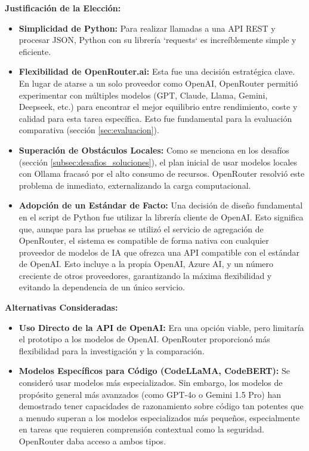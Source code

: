 \textbf{Justificación de la Elección:}
\begin{itemize}
    \item \textbf{Simplicidad de Python:} Para realizar llamadas a una API REST y procesar JSON, Python con su librería `requests` es increíblemente simple y eficiente.
    \item \textbf{Flexibilidad de OpenRouter.ai:} Esta fue una decisión estratégica clave. En lugar de atarse a un solo proveedor como OpenAI, OpenRouter permitió experimentar con múltiples modelos (GPT, Claude, Llama, Gemini, Deepseek, etc.) para encontrar el mejor equilibrio entre rendimiento, coste y calidad para esta tarea específica. Esto fue fundamental para la evaluación comparativa (sección \ref{sec:evaluacion}).
    \item \textbf{Superación de Obstáculos Locales:} Como se menciona en los desafíos (sección \ref{subsec:desafios_soluciones}), el plan inicial de usar modelos locales con Ollama fracasó por el alto consumo de recursos. OpenRouter resolvió este problema de inmediato, externalizando la carga computacional.
    \item \textbf{Adopción de un Estándar de Facto:} Una decisión de diseño fundamental en el script de Python fue utilizar la librería cliente de OpenAI. Esto significa que, aunque para las pruebas se utilizó el servicio de agregación de OpenRouter, el sistema es compatible de forma nativa con cualquier proveedor de modelos de IA que ofrezca una API compatible con el estándar de OpenAI. Esto incluye a la propia OpenAI, Azure AI, y un número creciente de otros proveedores, garantizando la máxima flexibilidad y evitando la dependencia de un único servicio.
\end{itemize}
\textbf{Alternativas Consideradas:}
\begin{itemize}
    \item \textbf{Uso Directo de la API de OpenAI:} Era una opción viable, pero limitaría el prototipo a los modelos de OpenAI. OpenRouter proporcionó más flexibilidad para la investigación y la comparación.
    \item \textbf{Modelos Específicos para Código (CodeLLaMA, CodeBERT):} Se consideró usar modelos más especializados. Sin embargo, los modelos de propósito general más avanzados (como GPT-4o o Gemini 1.5 Pro) han demostrado tener capacidades de razonamiento sobre código tan potentes que a menudo superan a los modelos especializados más pequeños, especialmente en tareas que requieren comprensión contextual como la seguridad. OpenRouter daba acceso a ambos tipos.
\end{itemize}


